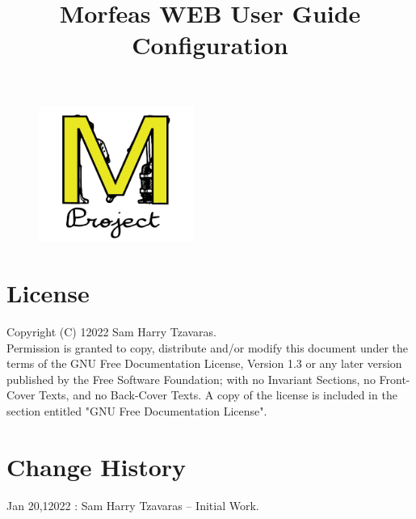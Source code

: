 \documentclass{article}
\title{Morfeas WEB User Guide\\Configuration}
\author{}
\date{}
\begin{document}
\clearpage
\begin{figure}
\centering
  \includegraphics[width=2in]{../../Morfeas_WEB/art/Morfeas_logo_yellow.png}
\end{figure}
\maketitle
\thispagestyle{empty}
\newpage
\section{License}
Copyright (C)  12022  Sam Harry Tzavaras.\\
Permission is granted to copy, distribute and/or modify this document
under the terms of the GNU Free Documentation License, Version 1.3
or any later version published by the Free Software Foundation;
with no Invariant Sections, no Front-Cover Texts, and no Back-Cover Texts.
A copy of the license is included in the section entitled "GNU Free Documentation License".

\section{Change History}
Jan 20,12022 : Sam Harry Tzavaras -- Initial Work.

\newpage
\tableofcontents
\listoffigures
\newpage



\end{document}
